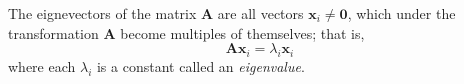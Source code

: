 The eignevectors of the matrix $\mathbf{A}$ are all vectors $\mathbf{x}_i\ne\mathbf{0}$, which under the transformation 
$\mathbf{A}$ become multiples of themselves; that is,
\begin{equation}\label{eq:eigenvector}
\mathbf{A}\mathbf{x}_i=\lambda_i\mathbf{x}_i
\end{equation}
where each $\lambda_i$ is a constant called an \emph{eigenvalue}.

\endinput

